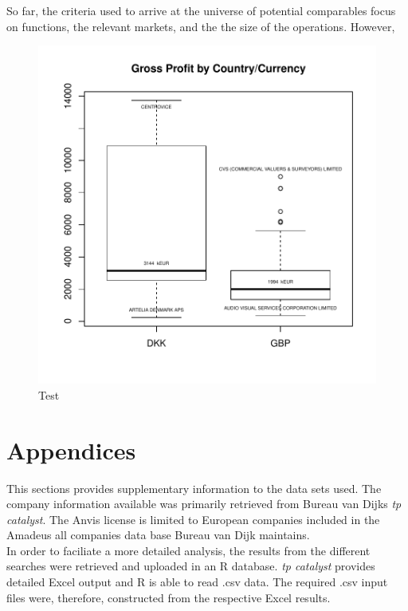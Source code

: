 \documentclass[12pt]{article}
\begin{document}
So far, the criteria used to arrive at the universe of potential comparables focus on functions, the relevant markets, and the the size of the operations. However,

\begin{figure}[!hbtp]
\includegraphics{AVS_OS_Docu-002}
\caption {Test}
\end{figure}
\section{Appendices}
This sections provides supplementary information to the data sets used. The company information available was primarily retrieved from Bureau van Dijks \emph{tp catalyst}. The Anvis license is limited to European companies included in the Amadeus all companies data base Bureau van Dijk maintains.\\[0.2cm]
In order to faciliate a more detailed analysis, the results from the different searches were retrieved and uploaded in an R \cite{Team:2014aa} database. \emph{tp catalyst} provides detailed Excel output and R is able to read .csv data. The required .csv input files were, therefore, constructed from the respective Excel results.
\end{document}

